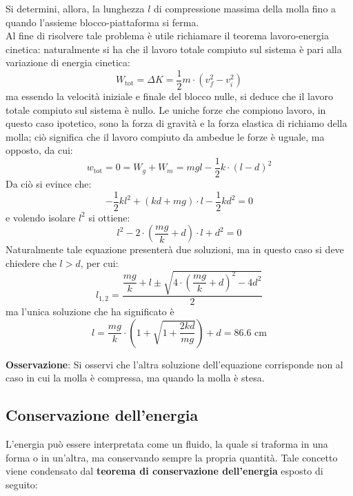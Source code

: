 \documentclass[a4paper]{extarticle}
\begin{document}
\noindent
Si determini, allora, la lunghezza $l$ di compressione massima della molla fino a quando l'assieme blocco-piattaforma si ferma.\\
Al fine di risolvere tale problema è utile richiamare il teorema lavoro-energia cinetica: naturalmente si ha che il lavoro totale compiuto sul sistema è pari alla variazione di energia cinetica:
\[W_{\text{tot}} = \Delta K = \frac{1}{2}m \cdot \left(v_f^2 - v_i^2\right)\]
ma essendo la velocità iniziale e finale del blocco nulle, si deduce che il lavoro totale compiuto sul sistema è nullo. Le uniche forze che compiono lavoro, in questo caso ipotetico, sono la forza di gravità e la forza elastica di richiamo della molla; ciò significa che il lavoro compiuto da ambedue le forze è uguale, ma opposto, da cui:
\[w_{\text{tot}}=0=W_g+W_m=mgl-\frac{1}{2}k \cdot (l-d)^2\]
Da ciò si evince che:
\[-\frac{1}{2}kl^2 + (kd+mg) \cdot l - \frac{1}{2}kd^2=0\]
e volendo isolare $l^2$ si ottiene:
\[l^2 - 2 \cdot \left(\frac{mg}{k} + d\right) \cdot l + d^2=0\]
Naturalmente tale equazione presenterà due soluzioni, ma in questo caso si deve chiedere che $l>d$, per cui:
\[l_{1,2}=\frac{\dfrac{mg}{k}+l \pm \sqrt{4 \cdot \left(\dfrac{mg}{k} + d\right)^2 - 4d^2}}{2}\]
ma l'unica soluzione che ha significato è
\[l = \frac{mg}{k} \cdot \left(1+\sqrt{1+\frac{2kd}{mg}}\right)+d = 86.6 \text{ cm}\]

\vspace{1em}
\noindent
\textbf{Osservazione}: Si osservi che l'altra soluzione dell'equazione corrisponde non al caso in cui la molla è compressa, ma quando la molla è stesa.

\newpage
\noindent
\subsection{Conservazione dell'energia}
L'energia può essere interpretata come un fluido, la quale si traforma in una forma o in un'altra, ma conservando sempre la propria quantità. Tale concetto viene condensato dal \textbf{teorema di conservazione dell'energia} esposto di seguito:
\end{document}
